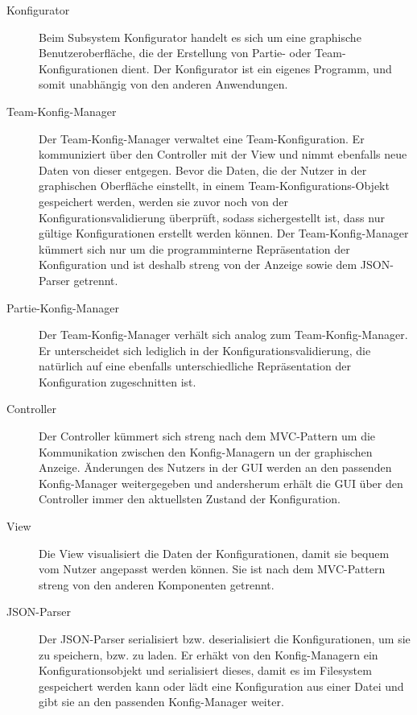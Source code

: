 \begin{description}

\item[Konfigurator]

Beim Subsystem Konfigurator handelt es sich um eine graphische Benutzeroberfläche, die der Erstellung von Partie- oder Team-Konfigurationen dient. Der Konfigurator ist ein eigenes Programm, und somit unabhängig von den anderen Anwendungen.

\item[Team-Konfig-Manager]
Der Team-Konfig-Manager verwaltet eine Team-Konfiguration. Er kommuniziert über den Controller mit der View und nimmt ebenfalls neue Daten von dieser entgegen. Bevor die Daten, die der Nutzer in der graphischen Oberfläche einstellt, in einem Team-Konfigurations-Objekt gespeichert werden, werden sie zuvor noch von der Konfigurationsvalidierung überprüft, sodass sichergestellt ist, dass nur gültige Konfigurationen erstellt werden können. Der Team-Konfig-Manager kümmert sich nur um die programminterne Repräsentation der Konfiguration und ist deshalb streng von der Anzeige sowie dem JSON-Parser getrennt.

\item[Partie-Konfig-Manager]
Der Team-Konfig-Manager verhält sich analog zum Team-Konfig-Manager. Er unterscheidet sich lediglich in der Konfigurationsvalidierung, die natürlich auf eine ebenfalls unterschiedliche Repräsentation der Konfiguration zugeschnitten ist.

\item[Controller]
Der Controller kümmert sich streng nach dem MVC-Pattern um die Kommunikation zwischen den Konfig-Managern un der graphischen Anzeige. Änderungen des Nutzers in der GUI werden an den passenden Konfig-Manager weitergegeben und andersherum erhält die GUI über den Controller immer den aktuellsten Zustand der Konfiguration.

\item[View]
Die View visualisiert die Daten der Konfigurationen, damit sie bequem vom Nutzer angepasst werden können. Sie ist nach dem MVC-Pattern streng von den anderen Komponenten getrennt.

\item[JSON-Parser]
Der JSON-Parser serialisiert bzw. deserialisiert die Konfigurationen, um sie zu speichern, bzw. zu laden. Er erhäkt von den Konfig-Managern ein Konfigurationsobjekt und serialisiert dieses, damit es im Filesystem gespeichert werden kann oder lädt eine Konfiguration aus einer Datei und gibt sie an den passenden Konfig-Manager weiter.
\end{description}


